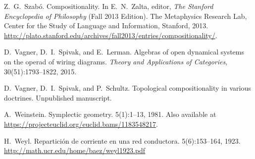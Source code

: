 \begin{thebibliography}{RSW00}
    Z.\ G.\ Szab\'o.
    \newblock Compositionality. 
    \newblock In E.\ N.\ Zalta, editor, {\em The Stanford Encyclopedia of Philosophy}
    (Fall 2013 Edition). The Metaphysics Research Lab, Center for the Study of Language and Information, Stanford, 2013.
    \newblock
    \href{http://plato.stanford.edu/archives/fall2013/entries/compositionality/}{http://plato.stanford.edu/archives/fall2013/entries/compositionality/}.


    D.\ Vagner, D.\ I.\ Spivak, and E.\ Lerman.
    \newblock Algebras of open dynamical systems on the operad of wiring
    diagrams.
    \newblock \emph{Theory and Applications of Categories}, 30(51):1793--1822,
    2015. 

    D.\ Vagner, D.\ I.\ Spivak, and P.\ Schultz.
    \newblock Topological compositionality in various doctrines.
    \newblock Unpublished manuscript.






    A.\ Weinstein.
    \newblock Symplectic geometry.
     { 5}(1):1--13, 1981.
    \newblock Also available at 	
    \href{https://projecteuclid.org/euclid.bams/1183548217}
    {https://projecteuclid.org/euclid.bams/1183548217}.

    H.\ Weyl.
    \newblock Repartici\'on de corriente en una red conductora.
     { 5}(6):153--164, 1923.
    \newblock \href{http://math.ucr.edu/home/baez/weyl1923.pdf}{http://math.ucr.edu/home/baez/weyl1923.pdf}



\end{thebibliography}

